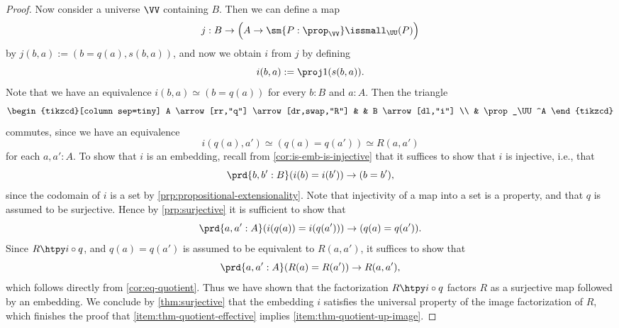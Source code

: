 \begin{proof}
  Now consider a universe $\VV$ containing $B$. Then we can define a map
  \begin{equation*}
    j:B\to\Big(A\to\sm{P:\prop_\VV}\issmall_\UU(P)\Big)
  \end{equation*}
  by $j(b,a):=(b=q(a),s(b,a))$, and now we obtain $i$ from $j$ by defining
  \begin{equation*}
    i(b,a):=\proj 1(s(b,a)).
  \end{equation*}
  Note that we have an equivalence $i(b,a)\simeq (b=q(a))$ for every $b:B$ and $a:A$.
  Then the triangle
  \begin{equation*}
    \begin{tikzcd}[column sep=tiny]
      A \arrow[rr,"q"] \arrow[dr,swap,"R"] & & B \arrow[dl,"i"] \\
      & \prop_\UU^A
    \end{tikzcd}
  \end{equation*}
  commutes, since we have an equivalence
  \begin{equation*}
    i(q(a),a') \simeq (q(a)=q(a')) \simeq R(a,a')
  \end{equation*}
  for each $a,a':A$. To show that $i$ is an embedding, recall from \cref{cor:is-emb-is-injective} that it suffices to show that $i$ is injective, i.e., that
  \begin{equation*}
    \prd{b,b':B}(i(b)=i(b'))\to (b=b'),
  \end{equation*}
  since the codomain of $i$ is a set by \cref{prp:propositional-extensionality}. Note that injectivity of a map into a set is a property, and that $q$ is assumed to be surjective. Hence by \cref{prp:surjective} it is sufficient to show that
  \begin{equation*}
    \prd{a,a':A}(i(q(a))=i(q(a')))\to (q(a)=q(a')).
  \end{equation*}
  Since $R\htpy i\circ q$, and $q(a)=q(a')$ is assumed to be equivalent to $R(a,a')$, it suffices to show that
  \begin{equation*}
    \prd{a,a':A}(R(a)=R(a'))\to R(a,a'),
  \end{equation*}
  which follows directly from \cref{cor:eq-quotient}. Thus we have shown that the factorization $R\htpy i\circ q$ factors $R$ as a surjective map followed by an embedding. We conclude by \cref{thm:surjective} that the embedding $i$ satisfies the universal property of the image factorization of $R$, which finishes the proof that \ref{item:thm-quotient-effective} implies \ref{item:thm-quotient-up-image}.
  

\end{proof}
